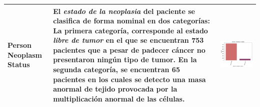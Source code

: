 \begin{table}[!htb]
\begin{threeparttable}
\begin{tabular}{p{2.5cm} p{7cm} p{6.5cm}}
		Person Neoplasm Status
		& El \textit{estado de la neoplasia} del paciente se clasifica de forma nominal en dos categorías: La primera categoría, corresponde al estado \textit{libre de tumor} en el que se encuentran 753 pacientes que a pesar de padecer cáncer no presentaron ningún tipo de tumor. En la segunda categoría, se encuentran 65 pacientes en los cuales se detecto una masa anormal de tejido provocada por la multiplicación anormal de las células.
		& \begin{center}\includegraphics[width=1\linewidth]{NOTEBOOK/IMAGENES_DESCRIPTIVAS/43_person_neoplasm_status}\end{center}
		\\ \hline
		
\end{tabular}
\end{threeparttable}
\end{table}




